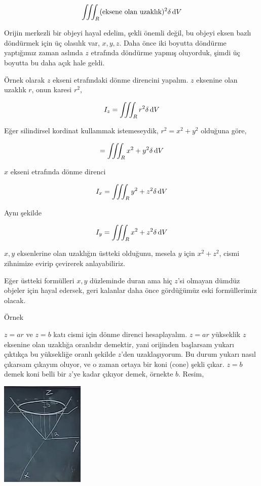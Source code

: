 \documentclass[12pt,fleqn]{article}\usepackage{../../common}
\begin{document}
$$ 
\iiint_R (\textrm{eksene olan uzaklık})^2 \delta \,\mathrm{d} V
$$

Orijin merkezli bir objeyi hayal edelim, şekli önemli değil, bu objeyi
eksen bazlı döndürmek için üç olasılık var, $x,y,z$. Daha önce iki boyutta
döndürme yaptığımız zaman aslında $z$ etrafında döndürme yapmış oluyorduk,
şimdi üç boyutta bu daha açık hale geldi. 

Örnek olarak $z$ ekseni etrafındaki dönme direncini yapalım. $z$ eksenine
olan uzaklık $r$, onun karesi $r^2$, 

$$ 
I_z = \iiint_R r^2 \delta \,\mathrm{d} V
$$

Eğer silindirsel kordinat kullammak istemeseydik, $r^2 = x^2 + y^2$ olduğuna
göre, 

$$ 
 = \iiint_R x^2 + y^2 \delta \,\mathrm{d} V
$$

$x$ ekseni etrafında dönme direnci

$$ 
I_x = \iiint_R y^2 + z^2 \delta \,\mathrm{d} V
$$

Aynı şekilde

$$ 
I_y = \iiint_R x^2 + z^2 \delta \,\mathrm{d} V
$$

$x,y$ eksenlerine olan uzaklığın üstteki olduğunu, mesela $y$ için
$x^2+z^2$, cismi zihnimize evirip çevirerek anlayabiliriz.

Eğer üstteki formülleri $x,y$ düzleminde duran ama hiç $z$'si olmayan
dümdüz objeler için hayal edersek, geri kalanlar daha önce gördüğümüz eski
formüllerimiz olacak.

Örnek

$z=ar$ ve $z=b$ katı cismi için dönme direnci hesaplayalım. $z=ar$
yükseklik $z$ eksenine olan uzaklığa oranlıdır demektir, yani orijinden
başlarsam yukarı çıktıkça bu yüksekliğe oranlı şekilde $z$'den
uzaklaşıyorum. Bu durum yukarı nasıl çıkarsam çıkayım oluyor, ve o zaman
ortaya bir koni (cone) şekli çıkar. $z=b$ demek koni belli bir $z$'ye kadar
çıkıyor demek, örnekte $b$. Resim,

\begin{center}
\includegraphics[height=5cm]{25_11.png}
\end{center}
\end{document}

